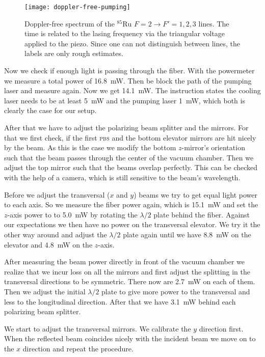 \documentclass[11pt, english, fleqn, DIV=15, headinclude, BCOR=2cm]{scrreprt}
\begin{document}
\begin{figure}
    \centering
    \texttt{[image: doppler-free-pumping]}
    \caption{%
        Doppler-free spectrum of the ${}^{85}\text{Ru}$ $F=2 \to F'=1,2,3$
        lines. The time is related to the lasing frequency via the triangular
        voltage applied to the piezo. Since one can not distinguish between
        lines, the labels are only rough estimates. 
    }
    \label{fig:doppler-free-pumping}
\end{figure}

Now we check if enough light is passing through the fiber. With the
powermeter we measure a total power of \SI{16.8}{\milli\watt}. Then be block
the path of the pumping laser and measure again. Now we get
\SI{14.1}{\milli\watt}. The instruction states the cooling laser needs to be at
least \SI{5}{\milli\watt} and the pumping laser \SI{1}{\milli\watt}, which both
is clearly the case for our setup.

After that we have to adjust the polarizing beam splitter and the mirrors. For
that we first check, if the first \textsc{pbs} and the bottom elevator mirrors
are hit nicely by the beam. As this is the case we modify the bottom
$z$-mirror's orientation such that the beam passes through the center of the
vacuum chamber. Then we adjust the top mirror such that the beams overlap
perfectly. This can be checked with the help of a camera, which is still
sensitive to the beam's wavelength.

Before we adjust the transversal ($x$ and $y$) beams we try to get equal light
power to each axis. So we measure the fiber power again, which is
\SI{15.1}{\milli\watt} and set the $z$-axis power to to \SI{5.0}{\milli\watt}
by rotating the $\lambda/2$ plate behind the fiber. Against our expectations we
then have no power on the transversal elevator. We try it the other way around
and adjust the $\lambda/2$ plate again until we have \SI{8.8}{\milli\watt} on
the elevator and \SI{4.8}{\milli\watt} on the $z$-axis.

After measuring the beam power directly in front of the vacuum chamber we
realize that we incur loss on all the mirrors and first adjust the splitting in
the transversal directions to be symmetric. There now are \SI{2.7}{\milli\watt}
on each of them. Then we adjust the initial $\lambda/2$ plate to give more
power to the transversal and less to the longitudinal direction. After that we
have \SI{3.1}{\milli\watt} behind each polarizing beam splitter.

We start to adjust the transversal mirrors. We calibrate the $y$ direction
first. When the reflected beam coincides nicely with the incident beam we move
on to the $x$ direction and repeat the procedure. 
\end{document}
